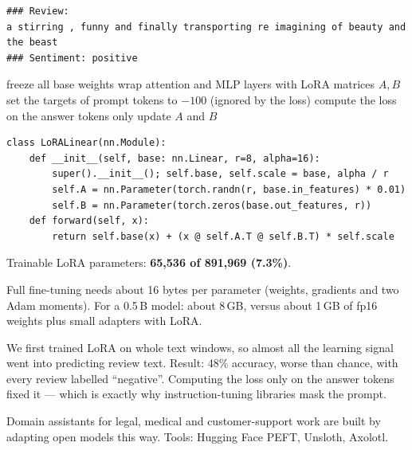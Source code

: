 \documentclass[11pt,a4paper]{article}
\begin{document}
\begin{bcode}
\begin{lstlisting}
### Review:
a stirring , funny and finally transporting re imagining of beauty and the beast
### Sentiment: positive
\end{lstlisting}
\end{bcode}
\begin{balgo}
\begin{algorithmic}[1]
\State freeze all base weights
\State wrap attention and MLP layers with LoRA matrices $A,B$
  \State set the targets of prompt tokens to $-100$ (ignored by the loss)
  \State compute the loss on the answer tokens only
  \State update $A$ and $B$
\EndFor
\end{algorithmic}
\end{balgo}
\begin{bcode}
\begin{lstlisting}
class LoRALinear(nn.Module):
    def __init__(self, base: nn.Linear, r=8, alpha=16):
        super().__init__(); self.base, self.scale = base, alpha / r
        self.A = nn.Parameter(torch.randn(r, base.in_features) * 0.01)
        self.B = nn.Parameter(torch.zeros(base.out_features, r))
    def forward(self, x):
        return self.base(x) + (x @ self.A.T @ self.B.T) * self.scale
\end{lstlisting}
\end{bcode}
\begin{bres}
Trainable LoRA parameters: \textbf{65,536 of 891,969 (7.3\%)}.
\end{bres}
\begin{bmath}
Full fine-tuning needs about 16 bytes per parameter (weights, gradients and two Adam moments). For a 0.5\,B model: about 8\,GB, versus about 1\,GB of fp16 weights plus small adapters with LoRA.
\end{bmath}
\begin{bwarn}
We first trained LoRA on whole text windows, so almost all the learning signal went into predicting review text. Result: 48\% accuracy, worse than chance, with every review labelled ``negative''. Computing the loss only on the answer tokens fixed it --- which is exactly why instruction-tuning libraries mask the prompt.
\end{bwarn}
\begin{bapp}
Domain assistants for legal, medical and customer-support work are built by adapting open models this way. Tools: Hugging Face PEFT, Unsloth, Axolotl.
\end{bapp}
\end{document}
